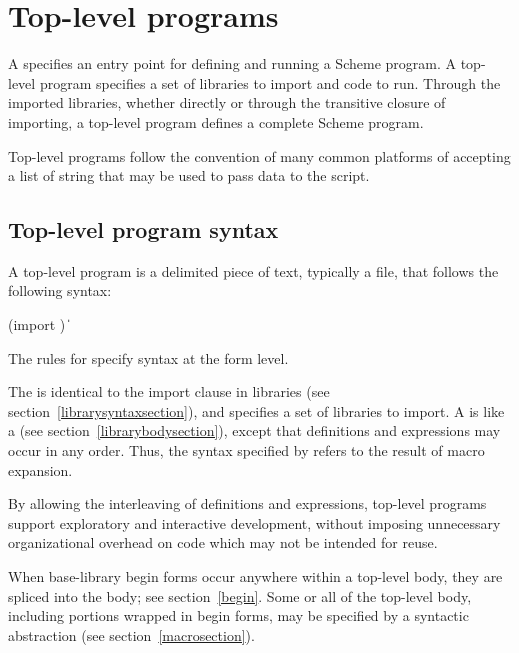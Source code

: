 \chapter{Top-level programs}
\label{programchapter}

A  specifies an entry point for defining and running
a Scheme program.  A top-level program specifies a set of libraries to import and
code to run.  Through the imported libraries, whether directly or through the
transitive closure of importing, a top-level program defines a complete Scheme
program.

Top-level programs follow the convention of many common platforms of accepting 
a list of string  that may be used to
pass data to the script.

\section{Top-level program syntax}
\label{programsyntaxsection}

A top-level program is a delimited piece of text, typically a file, that follows
the following syntax:
%
\begin{grammar}
 \:  
 \: (import )
 \: 
 \:  \| 
\end{grammar}
%
The rules for  specify syntax at the form level.

The  is identical to the import clause in
libraries (see section~\ref{librarysyntaxsection}), 
and specifies a set of libraries to import.  A  is like a  (see
section~\ref{librarybodysection}), except that 
definitions and expressions may occur in any order.  Thus, the syntax
specified by  refers to the result of macro
expansion.

\begin{rationale}
By allowing the interleaving of definitions and expressions, top-level 
programs support exploratory and interactive development, without 
imposing unnecessary organizational overhead on code which may not be 
intended for reuse.
\end{rationale}

When base-library {\cf begin} forms occur anywhere within a top-level body,
they are spliced into the body; see section~\ref{begin}.
Some or all of the top-level body, including portions wrapped in {\cf begin}
forms, may be specified by a syntactic abstraction
(see section~\ref{macrosection}).

